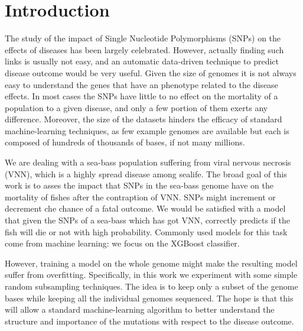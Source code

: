\section{Introduction}
\label{sec:intro}
The study of the impact of Single Nucleotide Polymorphisms (SNPs) on the effects of diseases has been largely celebrated. 
However, actually finding such links is usually not easy, and an automatic data-driven technique to predict disease outcome would be very useful.
Given the size of genomes it is not always easy to understand the genes that have an phenotype related to the disease effects.
In most cases the SNPs have little to no effect on the mortality of a population to a given disease, and only a few portion of them exerts any difference.
Moreover, the size of the datasets hinders the efficacy of standard machine-learning techniques, as few example genomes are available but each is composed of hundreds of thousands of bases, if not many millions.

We are dealing with a sea-bass population suffering from viral nervous necrosis (VNN), which is a highly spread disease among sealife.
The broad goal of this work is to asses the impact that SNPs in the sea-bass genome have on the mortality of fishes after the contraption of VNN.
SNPs might increment or decrement che chance of a fatal outcome. 
We would be satisfied with a model that given the SNPs of a sea-bass which has got VNN, correctly predicts if the fish will die or not with high probability.
Commonly used models for this task come from machine learning: we focus on the XGBoost classifier\cite{xgboost}.

However, training a model on the whole genome might make the resulting model suffer from overfitting.
Specifically, in this work we experiment with some simple random subsampling techniques.
The idea is to keep only a subset of the genome bases while keeping all the individual genomes sequenced.
The hope is that this will allow a standard machine-learning algorithm to better understand the structure and importance of the mutations with respect to the disease outcome.


